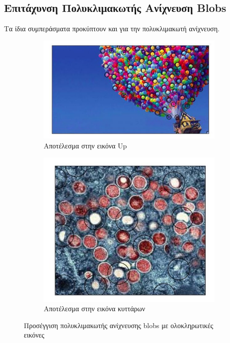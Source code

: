 \documentclass{article}
\newcommand{\eng}[1]{\foreignlanguage{english}{#1}}
\begin{document}
\subsection{Επιτάχυνση Πολυκλιμακωτής Ανίχνευση \eng{Blobs}}

Τα ίδια συμπεράσματα προκύπτουν και για την πολυκλιμακωτή ανίχνευση.

\begin{figure}[h]
    \centering
    \begin{subfigure}{0.7\textwidth}
        \includegraphics[width=\textwidth]{../image-plots/blob-detection-multiscale-ii-up-scaled.jpg}
        \caption{Αποτέλεσμα στην εικόνα \eng{Up}}
        \label{fig:cells-multiscale-ii}
    \end{subfigure}
    \begin{subfigure}{0.7\textwidth}
        \includegraphics[width=\textwidth]{../image-plots/blob-detection-multiscale-ii-cells-scaled.jpg}
        \caption{Αποτέλεσμα στην εικόνα κυττάρων}
        \label{fig:cells-multiscale-ii}
    \end{subfigure}
    \caption{Προσέγγιση πολυκλιμακωτής ανίχνευσης \eng{blobs} με ολοκληρωτικές εικόνες}
\end{figure}
\FloatBarrier
\end{document}
